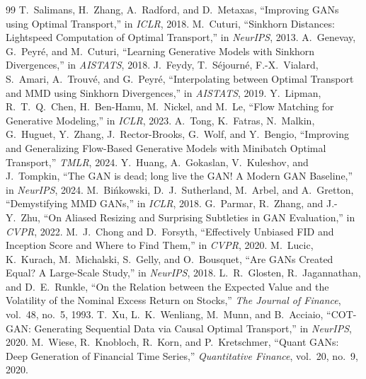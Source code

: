 \documentclass[10pt,twocolumn]{article}
\begin{document}
\begin{thebibliography}{99}
 T.~Salimans, H.~Zhang, A.~Radford, and D.~Metaxas,
``Improving GANs using Optimal Transport,'' in \emph{ICLR}, 2018.
 M.~Cuturi,
``Sinkhorn Distances: Lightspeed Computation of Optimal Transport,'' in \emph{NeurIPS}, 2013.
 A.~Genevay, G.~Peyr\'e, and M.~Cuturi,
``Learning Generative Models with Sinkhorn Divergences,'' in \emph{AISTATS}, 2018.
 J.~Feydy, T.~S\'ejourn\'e, F.-X.~Vialard, S.~Amari, A.~Trouv\'e, and
G.~Peyr\'e, ``Interpolating between Optimal Transport and MMD using Sinkhorn Divergences,''
in \emph{AISTATS}, 2019.
 Y.~Lipman, R.~T.~Q.~Chen, H.~Ben-Hamu, M.~Nickel, and M.~Le,
``Flow Matching for Generative Modeling,'' in \emph{ICLR}, 2023.
 A.~Tong, K.~Fatras, N.~Malkin, G.~Huguet, Y.~Zhang, J.~Rector-Brooks,
G.~Wolf, and Y.~Bengio, ``Improving and Generalizing Flow-Based Generative Models with
Minibatch Optimal Transport,'' \emph{TMLR}, 2024.
 Y.~Huang, A.~Gokaslan, V.~Kuleshov, and J.~Tompkin,
``The GAN is dead; long live the GAN! A Modern GAN Baseline,'' in \emph{NeurIPS}, 2024.
 M.~Bi\'nkowski, D.~J.~Sutherland, M.~Arbel, and A.~Gretton,
``Demystifying MMD GANs,'' in \emph{ICLR}, 2018.
 G.~Parmar, R.~Zhang, and J.-Y.~Zhu,
``On Aliased Resizing and Surprising Subtleties in GAN Evaluation,'' in \emph{CVPR}, 2022.
 M.~J.~Chong and D.~Forsyth,
``Effectively Unbiased FID and Inception Score and Where to Find Them,'' in \emph{CVPR}, 2020.
 M.~Lucic, K.~Kurach, M.~Michalski, S.~Gelly, and O.~Bousquet,
``Are GANs Created Equal? A Large-Scale Study,'' in \emph{NeurIPS}, 2018.
 L.~R.~Glosten, R.~Jagannathan, and D.~E.~Runkle,
``On the Relation between the Expected Value and the Volatility of the Nominal Excess
Return on Stocks,'' \emph{The Journal of Finance}, vol.~48, no.~5, 1993.
 T.~Xu, L.~K.~Wenliang, M.~Munn, and B.~Acciaio,
``COT-GAN: Generating Sequential Data via Causal Optimal Transport,'' in
\emph{NeurIPS}, 2020.
 M.~Wiese, R.~Knobloch, R.~Korn, and P.~Kretschmer,
``Quant GANs: Deep Generation of Financial Time Series,'' \emph{Quantitative Finance},
vol.~20, no.~9, 2020.
\end{thebibliography}
\end{document}
